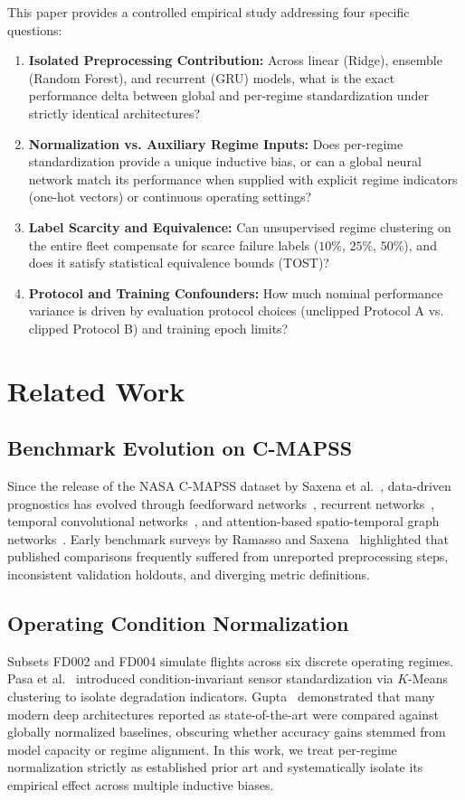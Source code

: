 \documentclass[conference]{IEEEtran}
\begin{document}
This paper provides a controlled empirical study addressing four specific questions:
\begin{enumerate}
    \item \textbf{Isolated Preprocessing Contribution:} Across linear (Ridge), ensemble (Random Forest), and recurrent (GRU) models, what is the exact performance delta between global and per-regime standardization under strictly identical architectures?
    \item \textbf{Normalization vs. Auxiliary Regime Inputs:} Does per-regime standardization provide a unique inductive bias, or can a global neural network match its performance when supplied with explicit regime indicators (one-hot vectors) or continuous operating settings?
    \item \textbf{Label Scarcity and Equivalence:} Can unsupervised regime clustering on the entire fleet compensate for scarce failure labels ($10\%$, $25\%$, $50\%$), and does it satisfy statistical equivalence bounds (TOST)?
    \item \textbf{Protocol and Training Confounders:} How much nominal performance variance is driven by evaluation protocol choices (unclipped Protocol A vs. clipped Protocol B) and training epoch limits?
\end{enumerate}

\section{Related Work}

\subsection{Benchmark Evolution on C-MAPSS}
Since the release of the NASA C-MAPSS dataset by Saxena et al.~\cite{saxena2008cmapss}, data-driven prognostics has evolved through feedforward networks~\cite{heimes2008recurrent}, recurrent networks~\cite{zheng2017long, cho2014gru}, temporal convolutional networks~\cite{li2018tcn}, and attention-based spatio-temporal graph networks~\cite{stagnn2024}. Early benchmark surveys by Ramasso and Saxena~\cite{ramasso2014investigating} highlighted that published comparisons frequently suffered from unreported preprocessing steps, inconsistent validation holdouts, and diverging metric definitions.

\subsection{Operating Condition Normalization}
Subsets FD002 and FD004 simulate flights across six discrete operating regimes. Pasa et al.~\cite{pasa2019} introduced condition-invariant sensor standardization via $K$-Means clustering to isolate degradation indicators. Gupta~\cite{gupta2024auditing} demonstrated that many modern deep architectures reported as state-of-the-art were compared against globally normalized baselines, obscuring whether accuracy gains stemmed from model capacity or regime alignment. In this work, we treat per-regime normalization strictly as established prior art and systematically isolate its empirical effect across multiple inductive biases.
\end{document}
